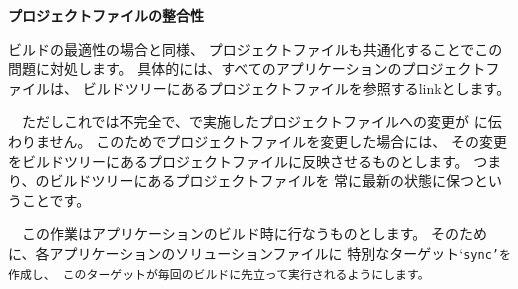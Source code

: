 \medskip
\noindent
\bf{プロジェクトファイルの整合性}
\begin{narrow}[20pt]
	ビルドの最適性の場合と同様、
	プロジェクトファイルも共通化することでこの問題に対処します。
	具体的には、すべてのアプリケーションのプロジェクトファイルは、
	\SprLib ビルドツリーにあるプロジェクトファイルを参照するlinkとします。

	　ただしこれでは不完全で、で実施したプロジェクトファイルへの変更が
	に伝わりません。
	このためでプロジェクトファイルを変更した場合には、
	その変更を\SprLib ビルドツリーにあるプロジェクトファイルに反映させるものとします。
	つまり、\SprLib のビルドツリーにあるプロジェクトファイルを
	常に最新の状態に保つということです。

	　この作業はアプリケーションのビルド時に行なうものとします。
	そのために、各アプリケーションのソリューションファイルに
	特別なターゲット`\tt{sync}'を作成し、
	このターゲットが毎回のビルドに先立って実行されるようにします。


\end{narrow}
